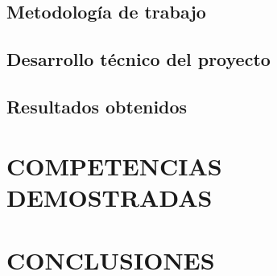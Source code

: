\subsection{Metodología de trabajo} 
\subsection{Desarrollo técnico del proyecto}



\subsection{Resultados obtenidos}


\newpage
\section{COMPETENCIAS DEMOSTRADAS}

\newpage
\section{CONCLUSIONES}
